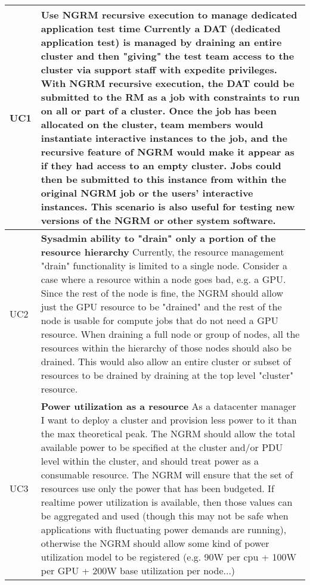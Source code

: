 \begin{longtable}{|p{1cm}|p{15cm}|}\hline
  UC1 & \textbf{Use NGRM recursive execution to manage dedicated application
	test time}\newline
	Currently a DAT (dedicated application test) is managed
	by draining an entire cluster and then "giving" the test team access
	to the cluster via support staff with expedite privileges. With
	NGRM recursive execution, the DAT could be submitted to the RM as
	a job with constraints to run on all or part of a cluster. Once the
	job has been allocated on the cluster, team members would instantiate
	interactive instances to the job, and the recursive feature of NGRM
	would make it appear as if they had access to an empty cluster. Jobs
	could then be submitted to this instance from within the original
	NGRM job or the users' interactive instances. This scenario is also
	useful for testing new versions of the NGRM or other system software.\\
  \hline
  UC2 & \textbf{Sysadmin ability to "drain" only a portion of the resource
	hierarchy}\newline
	Currently, the resource management "drain" functionality is limited
	to a single node. Consider a case where a resource within a node goes
	bad, e.g. a GPU. Since the rest of the node is fine, the NGRM should
	allow just the GPU resource to be "drained" and the rest of the
	node is usable for compute jobs that do not need a GPU resource.
	When draining a full node or group of nodes, all the resources within
	the hierarchy of those nodes should also be drained. This would also
	allow an entire cluster or subset of resources to be drained by
	draining at the top level "cluster" resource.\\
  \hline
  UC3 & \textbf{Power utilization as a resource}\newline
	As a datacenter manager I want to deploy a cluster and provision less
	power to it than the max theoretical peak. The NGRM should allow the
	total available power to be specified at the cluster and/or PDU level
	within the cluster, and should treat power as a consumable resource.
	The NGRM will ensure that the set of resources use only the power that
	has been budgeted. If realtime power utilization is available, then
	those values can be aggregated and used (though this may not be safe
	when applications with fluctuating power demands are running),
	otherwise the NGRM should allow some kind of power utilization model
	to be registered (e.g. 90W per cpu + 100W per GPU + 200W base
	utilization per node...)\\

\end{longtable}
